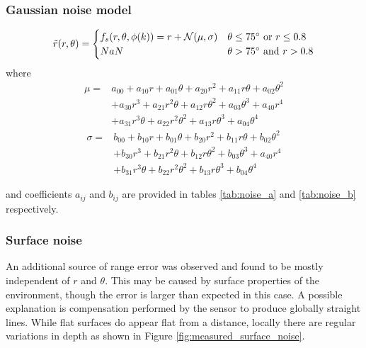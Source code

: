 		\subsubsection{Gaussian noise model}
		\begin{equation}
			\tilde{r}(r,\theta) = 
				\begin{cases}
					\hfill
					f_s(r,\theta,\phi(k)) = r + \mathcal{N}(\mu,\sigma)
						\hfill & \text{$\theta \leq 75^\circ$ or $r \leq 0.8$}\\
					NaN \hfill & \text{$\theta > 75^\circ$ and $r > 0.8$}
				\end{cases} 
		\end{equation}	
		where
		\begin{equation} \label{eq:mean}
			\begin{aligned}
				\mu = & a_{00} + a_{10}r + a_{01}\theta + a_{20}r^2 + a_{11}r\theta + a_{02}\theta^2\\
				      & + a_{30}r^3 + a_{21}r^2\theta + a_{12}r\theta^2 + a_{03}\theta^3 + a_{40}r^4 \\ 
				      & + a_{31}r^3\theta + a_{22}r^2\theta^2 + a_{13}r\theta^3 + a_{04}\theta^4
			\end{aligned}		
		\end{equation}
		\begin{equation} \label{eq:std}
			\begin{aligned}
				\sigma = & b_{00} + b_{10}r + b_{01}\theta + b_{20}r^2 + b_{11}r\theta + b_{02}\theta^2\\
			         	 & + b_{30}r^3 + b_{21}r^2\theta + b_{12}r\theta^2 + b_{03}\theta^3 + a_{40}r^4 \\ 
			         	 & + b_{31}r^3\theta + b_{22}r^2\theta^2 + b_{13}r\theta^3 + b_{04}\theta^4
			\end{aligned}
		\end{equation}
		
		and coefficients $a_{ij}$ and $b_{ij}$ are provided in tables \ref{tab:noise_a} and \ref{tab:noise_b} respectively.
				
					

		\subsubsection{Surface noise}
		An additional source of range error was observed and found to be mostly independent of $r$ and $\theta$. This may be caused by surface properties of the environment, though the error is larger than expected in this case. A possible explanation is compensation performed by the sensor to produce globally straight lines. While flat surfaces do appear flat from a distance, locally there are regular variations in depth as shown in Figure \ref{fig:measured_surface_noise}. 
		
